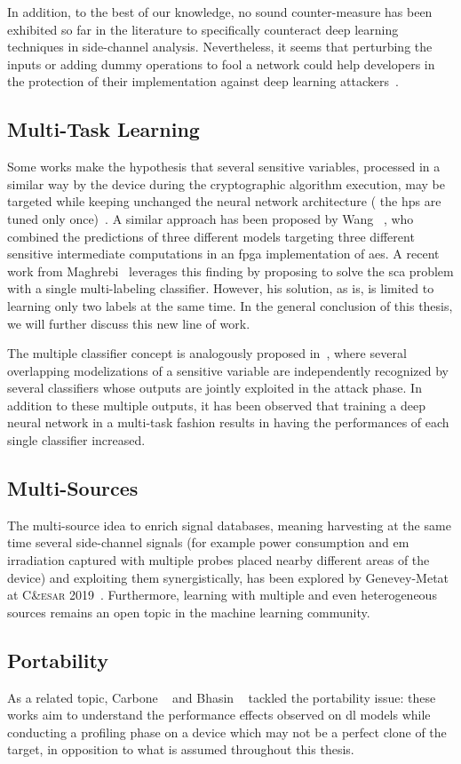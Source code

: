 In addition, to the best of our knowledge, no sound counter-measure has been exhibited so far in the literature to specifically counteract deep learning techniques in side-channel analysis.
Nevertheless, it seems that perturbing the inputs or adding dummy operations to fool a network could help developers in the protection of their implementation against deep learning attackers~\cite{bertrand_fool_2020}.

\subsection{Multi-Task Learning}
\label{sec:multi-task}
Some works make the hypothesis that several sensitive variables, processed in a similar way by the device during the cryptographic algorithm execution, may be targeted while keeping unchanged the neural network architecture (\ie{} the \glspl{hp} are tuned only once)~\cite{green_not_2019}.
A similar approach has been proposed by Wang \etal{}~\cite{wang_tandem_2020}, who combined the predictions of three different models targeting three different sensitive intermediate computations in an \gls{fpga} implementation of \gls{aes}.
A recent work from Maghrebi~\cite{maghrebi_deep_2020} leverages this finding by proposing to solve the \gls{sca} problem with a single multi-labeling classifier.
However, his solution, as is, is limited to learning only two labels at the same time.
In the general conclusion of this thesis, we will further discuss this new line of work.

The multiple classifier concept is analogously proposed in~\cite{destouet_wavelet_2020}, where several overlapping modelizations of a sensitive variable are independently recognized by several classifiers whose outputs are jointly exploited in the attack phase.
In addition to these multiple outputs, it has been observed that training a deep neural network in a multi-task fashion results in having the performances of each single classifier increased.

\subsection{Multi-Sources}
The multi-source idea to enrich signal databases, meaning harvesting at the same time several side-channel signals (for example power consumption and \gls{em} irradiation captured with multiple probes placed nearby different areas of the device) and exploiting them synergistically, has been explored by Genevey-Metat \etal{} at \textsc{C\&esar} 2019~\cite{genevey_combining_2019}.
Furthermore, learning with multiple and even heterogeneous sources remains an open topic in the machine learning community.

\subsection{Portability}
As a related topic, Carbone \etal{}~\cite{carbone_deep_2019} and Bhasin \etal{}~\cite{bhasin_mind_2019} tackled the portability issue: these works aim to understand the performance effects observed on \gls{dl} models while conducting a profiling phase on a device which may not be a perfect clone of the target, in opposition to what is assumed throughout this thesis.